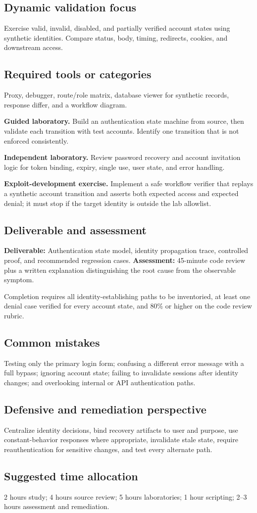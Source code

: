 \documentclass[11pt]{article}
\newcommand{\weekfield}[2]{%
  \Needspace{5\baselineskip}
  \subsection*{#1}
  #2
}
\newcommand{\deliverable}[1]{\textbf{Deliverable:} #1}
\newcommand{\assessment}[1]{\textbf{Assessment:} #1}
\begin{document}
\weekfield{Dynamic validation focus}{Exercise valid, invalid, disabled, and
partially verified account states using synthetic identities. Compare status,
body, timing, redirects, cookies, and downstream access.}

\weekfield{Required tools or categories}{Proxy, debugger, route/role matrix,
database viewer for synthetic records, response differ, and a workflow diagram.}

\begin{labbox}
\textbf{Guided laboratory.} Build an authentication state machine from source,
then validate each transition with test accounts. Identify one transition that is
not enforced consistently.

\textbf{Independent laboratory.} Review password recovery and account invitation
logic for token binding, expiry, single use, user state, and error handling.

\textbf{Exploit-development exercise.} Implement a safe workflow verifier that
replays a synthetic account transition and asserts both expected access and
expected denial; it must stop if the target identity is outside the lab allowlist.
\end{labbox}

\weekfield{Deliverable and assessment}{\deliverable{Authentication state model,
identity propagation trace, controlled proof, and recommended regression cases.}
\assessment{45-minute code review plus a written explanation distinguishing the
root cause from the observable symptom.}}

\begin{checkpoints}
Completion requires all identity-establishing paths to be inventoried, at least
one denial case verified for every account state, and 80\% or higher on the code
review rubric.
\end{checkpoints}

\weekfield{Common mistakes}{Testing only the primary login form; confusing a
different error message with a full bypass; ignoring account state; failing to
invalidate sessions after identity changes; and overlooking internal or API
authentication paths.}

\weekfield{Defensive and remediation perspective}{Centralize identity decisions,
bind recovery artifacts to user and purpose, use constant-behavior responses where
appropriate, invalidate stale state, require reauthentication for sensitive
changes, and test every alternate path.}

\weekfield{Suggested time allocation}{2 hours study; 4 hours source review; 5
hours laboratories; 1 hour scripting; 2--3 hours assessment and remediation.}
\end{document}

